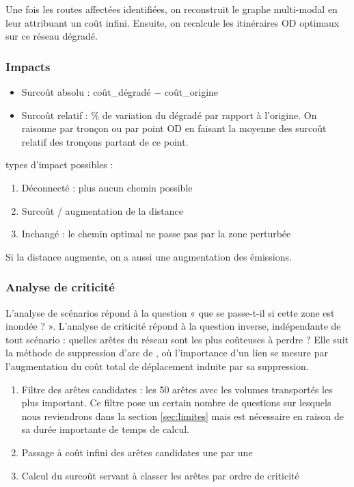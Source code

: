 \documentclass[12pt,a4paper,french]{report}
\begin{document}
	Une fois les routes affectées identifiées, on reconstruit le graphe multi-modal en leur attribuant un coût infini. Ensuite, on recalcule les itinéraires OD optimaux sur ce réseau dégradé.
	
	\subsubsection{Impacts}
	
	\begin{itemize}
		\item Surcoût absolu : coût\_dégradé $-$ coût\_origine
		\item Surcoût relatif : \% de variation du dégradé par rapport à l'origine. On raisonne par tronçon ou par point OD en faisant la moyenne des surcoût relatif des tronçons partant de ce point.
	\end{itemize}
	 types d'impact possibles :
	
	\begin{enumerate}
		\item Déconnecté : plus aucun chemin possible
		\item Surcoût / augmentation de la distance
		\item Inchangé : le chemin optimal ne passe pas par la zone perturbée
	\end{enumerate}
	
	Si la distance augmente, on a aussi une augmentation des émissions.
	
	\subsubsection{Analyse de criticité}
	\label{subsubsec:criticite}

	L'analyse de scénarios répond à la question « que se passe-t-il si cette zone est inondée ? ». L'analyse de criticité répond à la question inverse, indépendante de tout scénario : quelles arêtes du réseau sont les plus coûteuses à perdre ? Elle suit la méthode de suppression d'arc de \cite{Jenelius2015}, où l'importance d'un lien se mesure par l'augmentation du coût total de déplacement induite par sa suppression. 

	\begin{enumerate}
		\item Filtre des arêtes candidates : les 50 arêtes avec les volumes transportés les plus important. Ce filtre pose un certain nombre de questions sur lesquels nous reviendrons dans la section \ref{sec:limites} mais est nécessaire en raison de sa durée importante de temps de calcul.
		\item Passage à coût infini des arêtes candidates une par une
		\item Calcul du surcoût servant à classer les arêtes par ordre de criticité
	\end{enumerate}
	
\end{document}
